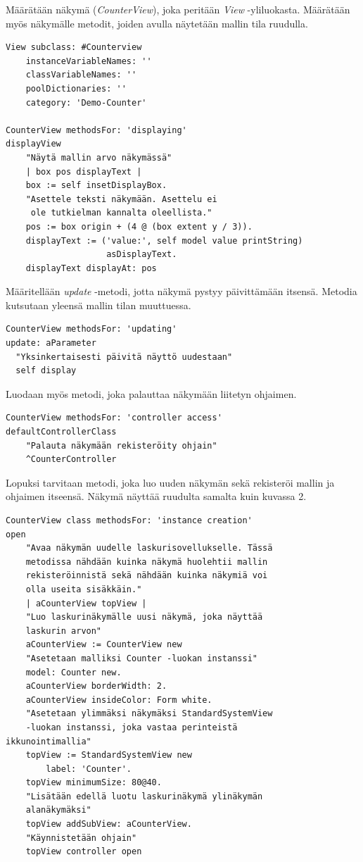 \documentclass[utf8]{gradu3}
\begin{document}
Määrätään näkymä (\emph{CounterView}), joka peritään \emph{View} -yliluokasta. Määrätään
myös näkymälle metodit, joiden avulla näytetään mallin tila ruudulla.
\begin{lstlisting}[language=Smalltalk]
View subclass: #Counterview
	instanceVariableNames: ''
	classVariableNames: ''
	poolDictionaries: ''
	category: 'Demo-Counter'

CounterView methodsFor: 'displaying'
displayView
	"Näytä mallin arvo näkymässä"
	| box pos displayText |
	box := self insetDisplayBox.
	"Asettele teksti näkymään. Asettelu ei
	 ole tutkielman kannalta oleellista."
	pos := box origin + (4 @ (box extent y / 3)).
	displayText := ('value:', self model value printString)
					asDisplayText.
	displayText displayAt: pos
\end{lstlisting}
Määritellään \emph{update} -metodi, jotta näkymä pystyy päivittämään itsensä. Metodia kutsutaan
yleensä mallin tilan muuttuessa.
\begin{lstlisting}[language=Smalltalk]
CounterView methodsFor: 'updating'
update: aParameter
  "Yksinkertaisesti päivitä näyttö uudestaan"
  self display
\end{lstlisting}
Luodaan myös metodi, joka palauttaa näkymään liitetyn ohjaimen.
\begin{lstlisting}[language=Smalltalk]
CounterView methodsFor: 'controller access'
defaultControllerClass
	"Palauta näkymään rekisteröity ohjain"
	^CounterController
\end{lstlisting}
Lopuksi tarvitaan metodi, joka luo uuden näkymän sekä rekisteröi mallin ja ohjaimen itseensä. Näkymä näyttää ruudulta
samalta kuin kuvassa 2.
\begin{lstlisting}[language=Smalltalk]
CounterView class methodsFor: 'instance creation'
open
	"Avaa näkymän uudelle laskurisovellukselle. Tässä 
	metodissa nähdään kuinka näkymä huolehtii mallin 
	rekisteröinnistä sekä nähdään kuinka näkymiä voi 
	olla useita sisäkkäin."
	| aCounterView topView |
	"Luo laskurinäkymälle uusi näkymä, joka näyttää 
	laskurin arvon"
	aCounterView := CounterView new
	"Asetetaan malliksi Counter -luokan instanssi"
	model: Counter new.
	aCounterView borderWidth: 2.
	aCounterView insideColor: Form white.
	"Asetetaan ylimmäksi näkymäksi StandardSystemView 
	-luokan instanssi, joka vastaa perinteistä
ikkunointimallia"
	topView := StandardSystemView new
		label: 'Counter'.
	topView minimumSize: 80@40.
	"Lisätään edellä luotu laskurinäkymä ylinäkymän 
	alanäkymäksi"
	topView addSubView: aCounterView.
	"Käynnistetään ohjain"
	topView controller open
\end{lstlisting}
\end{document}

